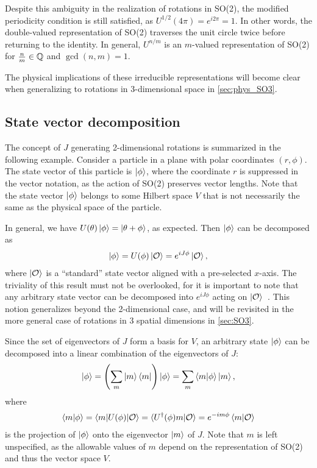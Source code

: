 Despite this ambiguity in the realization of rotations in SO(2), the modified periodicity condition is still satisfied, as $U^{1/2}(4\pi) = e^{i2\pi} = 1$. In other words, the double-valued representation of SO(2) traverses the unit circle twice before returning to the identity. In general, $U^{n/m}$ is an $m$-valued representation of SO(2) for $\frac{n}{m}\in\mathbb{Q}$ and $\gcd(n,m)=1$.

The physical implications of these irreducible representations will become clear when generalizing to rotations in 3-dimensional space in \cref{sec:phys_SO3}.

\subsection{State vector decomposition}\label{sub:SO2_decomp}
The concept of $J$ generating 2-dimensional rotations is summarized in the following example. Consider a particle in a plane with polar coordinates $(r,\phi)$. The state vector of this particle is $\ket{\phi}$, where the coordinate $r$ is suppressed in the vector notation, as the action of SO(2) preserves vector lengths. Note that the state vector $\ket{\phi}$ belongs to some Hilbert space $V$ that is not necessarily the same as the physical space of the particle.

In general, we have $U(\theta)\ket{\phi} = \ket{\theta+\phi}$, as expected. Then $\ket{\phi}$ can be decomposed as
\begin{align*}
    \ket{\phi} = U(\phi)\ket{\mathcal{O}} = e^{iJ\phi}\ket{\mathcal{O}},
\end{align*}
where $\ket{\mathcal{O}}$ is a ``standard'' state vector aligned with a pre-selected $x$-axis. The triviality of this result must not be overlooked, for it is important to note that any arbitrary state vector can be decomposed into $e^{iJ\phi}$ acting on $\ket{\mathcal{O}}$~\cite{Tung1985}. This notion generalizes beyond the 2-dimensional case, and will be revisited in the more general case of rotations in 3 spatial dimensions in \cref{sec:SO3}.

Since the set of eigenvectors of $J$ form a basis for $V$, an arbitrary state $\ket{\phi}$ can be decomposed into a linear combination of the eigenvectors of $J$:
\begin{align*}
    \ket{\phi} = \left( \sum_{m} \ket{m}\bra{m} \right)\ket{\phi} = \sum_{m} \braket{m|\phi}\ket{m},
\end{align*}
where
\begin{align*}
    \braket{m|\phi} = \braket{m|U(\phi)|\mathcal{O}} = \braket{U^\dagger(\phi)m|\mathcal{O}} = e^{-im\phi}\braket{m|\mathcal{O}}
\end{align*}
is the projection of $\ket{\phi}$ onto the eigenvector $\ket{m}$ of $J$. Note that $m$ is left unspecified, as the allowable values of $m$ depend on the representation of SO(2) and thus the vector space $V$.

